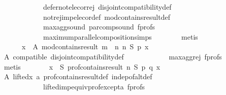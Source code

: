 \begin{isabellebody}
\ \ \ \ \ \ \ \ \ \ \ \ defer{\isacharunderscore}{\kern0pt}not{\isacharunderscore}{\kern0pt}elec{\isacharunderscore}{\kern0pt}or{\isacharunderscore}{\kern0pt}rej\ disjoint{\isacharunderscore}{\kern0pt}compatibility{\isacharunderscore}{\kern0pt}def\isanewline
\ \ \ \ \ \ \ \ \ \ \ \ not{\isacharunderscore}{\kern0pt}rej{\isacharunderscore}{\kern0pt}imp{\isacharunderscore}{\kern0pt}elec{\isacharunderscore}{\kern0pt}or{\isacharunderscore}{\kern0pt}def\ mod{\isacharunderscore}{\kern0pt}contains{\isacharunderscore}{\kern0pt}result{\isacharunderscore}{\kern0pt}def\isanewline
\ \ \ \ \ \ \ \ \ \ \ \ max{\isacharunderscore}{\kern0pt}agg{\isacharunderscore}{\kern0pt}sound\ par{\isacharunderscore}{\kern0pt}comp{\isacharunderscore}{\kern0pt}sound\ f{\isacharunderscore}{\kern0pt}profs\isanewline
\ \ \ \ \ \ \ \ \ \ \ \ maximum{\isacharunderscore}{\kern0pt}parallel{\isacharunderscore}{\kern0pt}composition{\isachardot}{\kern0pt}simps\isanewline
\ \ \ \ \ \ \isamarkupfalse%
\ metis\isanewline
\ \ \ \ \isamarkupfalse%
\isanewline
\ \ \ \ \ \ {\isachardoublequoteopen}{\isasymforall}x\ {\isasymin}\ A{\isachardot}{\kern0pt}\ mod{\isacharunderscore}{\kern0pt}contains{\isacharunderscore}{\kern0pt}result\ {\isacharparenleft}{\kern0pt}m\ {\isasymparallel}\isactrlsub {\isasymup}\ n{\isacharparenright}{\kern0pt}\ n\ S\ p\ x{\isachardoublequoteclose}\isanewline
\ \ \ \ \ \ \isamarkupfalse%
\ A\ compatible\ disjoint{\isacharunderscore}{\kern0pt}compatibility{\isacharunderscore}{\kern0pt}def\isanewline
\ \ \ \ \ \ \ \ \ \ \ \ max{\isacharunderscore}{\kern0pt}agg{\isacharunderscore}{\kern0pt}rej{}\ f{\isacharunderscore}{\kern0pt}profs\isanewline
\ \ \ \ \ \ \isamarkupfalse%
\ metis\isanewline
\ \ \ \ \isamarkupfalse%
\ \isamarkupfalse%
\ {\isachardoublequoteopen}{\isasymforall}x\ {\isasymin}\ S{\isachardot}{\kern0pt}\ prof{\isacharunderscore}{\kern0pt}contains{\isacharunderscore}{\kern0pt}result\ n\ S\ p\ q\ x{\isachardoublequoteclose}\isanewline
\ \ \ \ \ \ \isamarkupfalse%
\ A\ lifted{\isacharunderscore}{\kern0pt}x\ a{}\ prof{\isacharunderscore}{\kern0pt}contains{\isacharunderscore}{\kern0pt}result{\isacharunderscore}{\kern0pt}def\ indep{\isacharunderscore}{\kern0pt}of{\isacharunderscore}{\kern0pt}alt{\isacharunderscore}{\kern0pt}def\isanewline
\ \ \ \ \ \ \ \ \ \ \ \ lifted{\isacharunderscore}{\kern0pt}imp{\isacharunderscore}{\kern0pt}equiv{\isacharunderscore}{\kern0pt}prof{\isacharunderscore}{\kern0pt}except{\isacharunderscore}{\kern0pt}a\ f{\isacharunderscore}{\kern0pt}profs\isanewline

\end{isabellebody}
